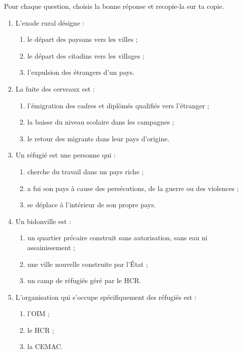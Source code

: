 \documentclass[11pt]{article}
\newcommand{\cle}[1]{{\popxbold\color{popdark}#1}}
\begin{document}
\begin{exercice}
Pour chaque question, choisis la bonne réponse et recopie-la sur ta copie.
\begin{enumerate}
\item L'\cle{exode rural} désigne :
\begin{enumerate}
\item le départ des paysans vers les villes ;
\item le départ des citadins vers les villages ;
\item l'expulsion des étrangers d'un pays.
\end{enumerate}
\item La \cle{fuite des cerveaux} est :
\begin{enumerate}
\item l'émigration des cadres et diplômés qualifiés vers l'étranger ;
\item la baisse du niveau scolaire dans les campagnes ;
\item le retour des migrants dans leur pays d'origine.
\end{enumerate}
\item Un \cle{réfugié} est une personne qui :
\begin{enumerate}
\item cherche du travail dans un pays riche ;
\item a fui son pays à cause des persécutions, de la guerre ou des violences ;
\item se déplace à l'intérieur de son propre pays.
\end{enumerate}
\item Un \cle{bidonville} est :
\begin{enumerate}
\item un quartier précaire construit sans autorisation, sans eau ni assainissement ;
\item une ville nouvelle construite par l'État ;
\item un camp de réfugiés géré par le HCR.
\end{enumerate}
\item L'organisation qui s'occupe spécifiquement des réfugiés est :
\begin{enumerate}
\item l'OIM ; \item le HCR ; \item la CEMAC.
\end{enumerate}
\end{enumerate}
\end{exercice}
\end{document}
